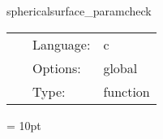 \vspace{5mm}


\hspace{5mm} sphericalsurface\_paramcheck 

\hspace{5mm}{\it check that all surface names are unique } 


\hspace{5mm}

 \begin{tabular*}{160mm}{cll} 
~ & Language:  & c \\ 
~ & Options:  & global \\ 
~ & Type:  & function \\ 
\end{tabular*} 



\vspace{5mm}\parskip = 10pt 
